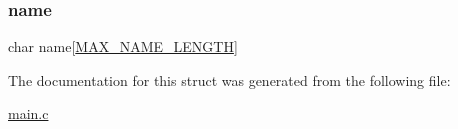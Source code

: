 \hypertarget{structteacher_ad50982abf9e9bbbc784f8f17fa25b1b2}{}\label{structteacher_ad50982abf9e9bbbc784f8f17fa25b1b2} 
\subsubsection{\texorpdfstring{name}{name}}
{\footnotesize\ttfamily char name\mbox{[}\hyperlink{main_8c_a0c397a708cec89c74029582574516b30}{M\+A\+X\+\_\+\+N\+A\+M\+E\+\_\+\+L\+E\+N\+G\+TH}\mbox{]}}



The documentation for this struct was generated from the following file\+:\begin{DoxyCompactItemize}
\item 
\hyperlink{main_8c}{main.\+c}\end{DoxyCompactItemize}
